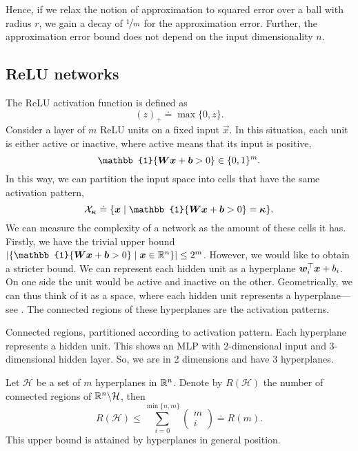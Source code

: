 Hence, if we relax the notion of approximation to squared error over a ball with radius $r$, we
gain a decay of $\nicefrac{1}{m}$ for the approximation error. Further, the approximation error
bound does not depend on the input dimensionality $n$.

\subsection{ReLU networks}

The ReLU activation function is defined as \[
    (z)_+ \doteq \max \{ 0,z \}.
\]
Consider a layer of $m$ ReLU units on a fixed input $\vec{x}$. In this situation, each unit is
either active or inactive, where active means that its input is positive, \[
    \mathbb{1}\{ \mat{W} \vec{x} + \vec{b} > 0 \} \in \{ 0,1 \}^m.
\]
In this way, we can partition the input space into cells that have the same activation pattern, \[
    \mathcal{X}_{\vec{\kappa}} \doteq \{ \vec{x} \mid \mathbb{1}\{ \mat{W} \vec{x} + \vec{b} > 0 \} = \vec{\kappa} \}.
\]
We can measure the complexity of a network as the amount of these cells it has. Firstly, we have
the trivial upper bound $|\{ \mathbb{1}\{ \mat{W} \vec{x} + \vec{b} > 0 \} \mid \vec{x} \in \R^n
    \}| \leq 2^m$. However, we would like to obtain a stricter bound. We can represent each hidden unit
as a hyperplane $\bm{w}_i^\top\bm{x} + b_i$. On one side the unit would be active and
inactive on the other. Geometrically, we can thus think of it as a space, where each hidden unit
represents a hyperplane---see . The connected regions of these
hyperplanes are the activation patterns.

\begin{marginfigure}
    \centering
    \caption{Connected regions, partitioned according to activation pattern. Each hyperplane represents a hidden unit. This shows an MLP with 2-dimensional input and 3-dimensional hidden layer. So, we are in 2 dimensions and have 3 hyperplanes.}
    \label{fig:connected-regions}
\end{marginfigure}

\begin{theorem}
    Let $\mathcal{H}$ be a set of $m$ hyperplanes in $\mathbb{R}^n$. Denote by $R(\mathcal{H})$ the number of connected regions of $\mathbb{R}^n \backslash \mathcal{H}$, then \[
        R(\mathcal{H}) \leq \sum_{i=0}^{\min \{ n,m \}} \begin{pmatrix} m \\ i \end{pmatrix} \doteq R(m).
    \]
    This upper bound is attained by hyperplanes in general position.
\end{theorem}

